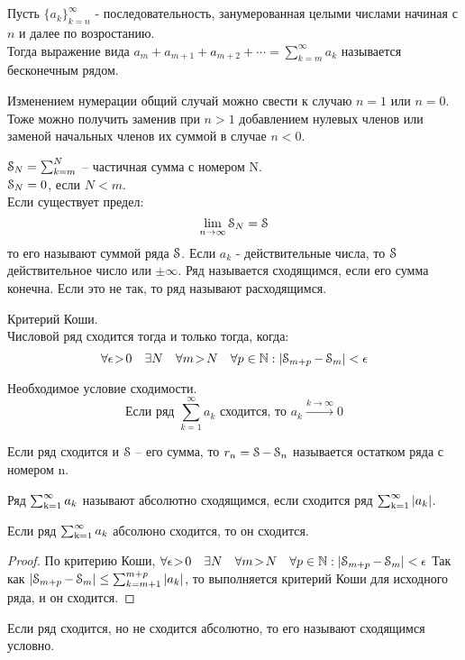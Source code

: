 
\chapter{}
\begin{deff}
Пусть $ \{a_k \}_{k=n}^{\infty} $ - последовательность, занумерованная целыми числами начиная с $ n $ и далее по возростанию.\\
Тогда выражение вида $a_m+a_{m+1}+a_{m+2}+ \cdots = \sum_{k=m}^{\infty} a_k$ называется бесконечным рядом.\\
\end{deff}
Изменением нумерации общий случай можно свести к случаю $n=1$ или $n=0$.
Тоже можно получить заменив при $n>1$ добавлением нулевых членов или заменой начальных членов их суммой в случае $n<0$.
\begin{deff}
$ \operatorname{\EuScript{S}}_{N} = \sum_{k=m}^{N} $ -- частичная сумма с номером N.\\
$ \operatorname{\EuScript{S}}_{N} = 0 $, если $ N < m $.\\
Если существует предел:
$$ \lim_{n \to \infty} {\operatorname{\EuScript{S}}_N} = \operatorname{\EuScript{S}} $$
то его называют суммой ряда $\operatorname{\EuScript{S}}$. Если $a_k$ - действительные числа, то $\operatorname{\EuScript{S}}$ действительное число или $\pm \infty$.
Ряд называется сходящимся, если его сумма конечна. 
Если это не так, то ряд называют расходящимся.
\end{deff}
\begin{st}Критерий Коши.\\
Числовой ряд сходится тогда и только тогда, когда:
$$ \forall{\epsilon\!>\! 0} \quad \exists N \quad \forall m \! >\! N \quad \forall p \in \operatorname{\mathbb{N}} : \left| \operatorname{\EuScript{S}}_{m+p} - \operatorname{\EuScript{S}}_m \right| < \epsilon$$ 
\end{st}
\begin{st}Необходимое условие сходимости.\\
$$ \mbox{Если ряд } \sum_{k=1}^{\infty} a_k \mbox{ сходится, то } a_k \xrightarrow{k\to\infty}0$$
\end{st}
\begin{deff}
Если ряд сходится и $\operatorname{\EuScript{S}}$ -- его сумма, то $r_n = \operatorname{\EuScript{S}} - \operatorname{\EuScript{S}}_n$ называется остатком ряда с номером n.
\end{deff}
\begin{deff}
Ряд $\operatorname{\sum_{k=1}^{\infty}} a_k $ называют абсолютно сходящимся, если сходится ряд $\operatorname{\sum_{k=1}^{\infty}} |a_k| $.
\end{deff}
\begin{thm}
Если ряд $\operatorname{\sum_{k=1}^{\infty}} a_k$ абсолюно сходится, то он сходится.
\end{thm}
\begin{proof}
По критерию Коши, $ \forall{\epsilon\!>\! 0} \quad \exists N \quad \forall m \! >\! N \quad \forall p \in \operatorname{\mathbb{N}} : \left| \operatorname{\EuScript{S}}_{m+p} - \operatorname{\EuScript{S}}_m \right| < \epsilon$
Так как $\left| \operatorname{\EuScript{S}}_{m+p} - \operatorname{\EuScript{S}}_m \right| \le \sum_{k=m+1}^{m+p}|a_k|$, то выполняется критерий Коши для исходного ряда, и он сходится.
\end{proof}
\begin{deff}
Если ряд сходится, но не сходится абсолютно, то его называют сходящимся условно.
\end{deff}
